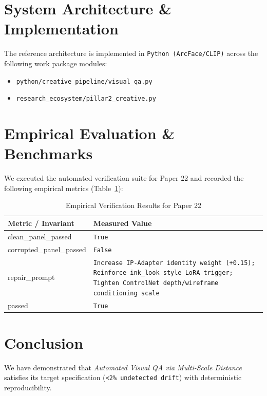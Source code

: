 \documentclass[10pt,twocolumn]{article}
\begin{document}
\section{System Architecture \& Implementation}
The reference architecture is implemented in \texttt{Python (ArcFace/CLIP)} across the following work package modules:
\begin{itemize}
  \item \texttt{python/creative\_pipeline/visual\_qa.py}
  \item \texttt{research\_ecosystem/pillar2\_creative.py}
\end{itemize}

\section{Empirical Evaluation \& Benchmarks}
We executed the automated verification suite for Paper 22 and recorded the following empirical metrics (Table~\ref{tab:metrics}):

\begin{table}[htbp]
\centering
\caption{Empirical Verification Results for Paper 22}
\label{tab:metrics}
\begin{tabular}{ll}
\toprule
\textbf{Metric / Invariant} & \textbf{Measured Value} \\
\midrule
    clean\_panel\_passed & \texttt{True} \\
    corrupted\_panel\_passed & \texttt{False} \\
    repair\_prompt & \texttt{Increase IP-Adapter identity weight (+0.15); Reinforce ink\_look style LoRA trigger; Tighten ControlNet depth/wireframe conditioning scale} \\
    passed & \texttt{True} \\
\bottomrule
\end{tabular}
\end{table}

\section{Conclusion}
We have demonstrated that \textit{Automated Visual QA via Multi-Scale Distance} satisfies its target specification (\texttt{<2\% undetected drift}) with deterministic reproducibility.



\end{document}

